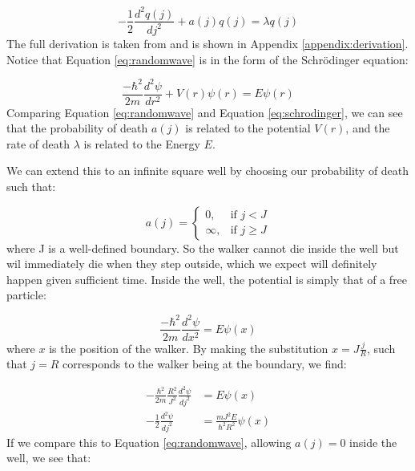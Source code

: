 \documentclass[journal]{IEEEtran}
\begin{document}
\begin{equation}
  -\frac{1}{2} \frac{d^2q(j)}{dj^2} + a(j)q(j) = \lambda q(j)
  \label{eq:randomwave}
\end{equation}
The full derivation is taken from \cite{MarcusNewton2020} and is shown in
Appendix \ref{appendix:derivation}. Notice that Equation \ref{eq:randomwave} is
in the form of the Schr\"{o}dinger equation:

\begin{equation}
  \label{eq:schrodinger}
  \frac{-\hbar^2}{2m}\frac{d^2 \psi}{dr^2} + V(r)\psi(r) = E\psi(r)
\end{equation}
Comparing Equation \ref{eq:randomwave} and Equation \ref{eq:schrodinger}, we can
see that the probability of death $a(j)$ is related to the potential $V(r)$,
and the rate of death $\lambda$ is related to the Energy $E$.

We can extend this to an infinite square well by choosing our probability of
death such that:

\begin{equation}
  \label{eq:squarewell}
    a(j) =
    \begin{cases}
      0,& \text{if } j < J\\
      \infty,& \text{if } j \geq J
    \end{cases}
    \nonumber
\end{equation}
where J is a well-defined boundary. So the walker cannot die inside the well but
wil immediately die when they step outside, which we expect will definitely
happen given sufficient time. Inside the well, the potential is simply that of a
free particle:

\begin{equation}
  \frac{-\hbar^2}{2m}\frac{d^2 \psi}{dx^2} = E\psi(x)
  \nonumber
\end{equation}
where $x$ is the position of the walker. By making the substitution
$x=J\frac{j}{R}$, such that $j=R$ corresponds to the walker being at the
boundary, we find:

\begin{equation}
  \begin{split}
    -\frac{\hbar^2}{2m}\frac{R^2}{J^2}\frac{d^2\psi}{dj^2} &= E\psi(x)\\
    -\frac{1}{2}\frac{d^2\psi}{dj^2} &= \frac{mJ^2E}{\hbar^2R^2}\psi(x)
  \end{split}
  \nonumber
\end{equation}
If we compare this to Equation \ref{eq:randomwave}, allowing $a(j) = 0$ inside
the well, we see that:
\end{document}
